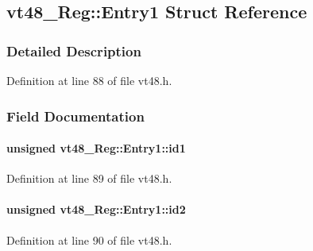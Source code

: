 \subsection{vt48\_\-Reg::Entry1 Struct Reference}
\label{structvt48__Reg_1_1Entry1}


\subsubsection{Detailed Description}


Definition at line 88 of file vt48.h.

\subsubsection{Field Documentation}
\paragraph[{id1}]{\setlength{\rightskip}{0pt plus 5cm}unsigned {\bf vt48\_\-Reg::Entry1::id1}}\hfill\label{structvt48__Reg_1_1Entry1_a4abd914be7d73fb1ffe1679ea57ff8ee}


Definition at line 89 of file vt48.h.
\paragraph[{id2}]{\setlength{\rightskip}{0pt plus 5cm}unsigned {\bf vt48\_\-Reg::Entry1::id2}}\hfill\label{structvt48__Reg_1_1Entry1_af9f906bb5781ec6ee5be82383b0bafc0}


Definition at line 90 of file vt48.h.